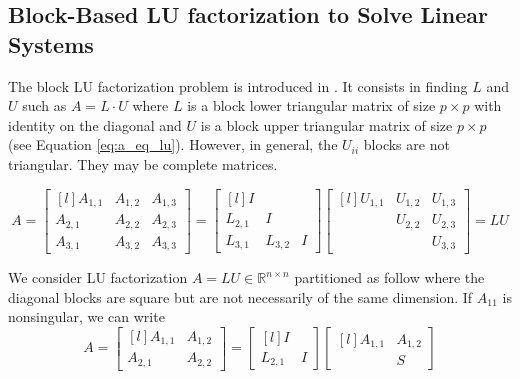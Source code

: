 

\subsection{Block-Based LU factorization to Solve Linear Systems}

The block LU factorization problem is introduced in \cite{DemHS1995} \cite{GoluL1983} \cite{BuncR1976}.
It consists in finding $L$ and $U$ such as $A=L\cdot U$ where $L$ is a block lower triangular matrix of size $p \times p$ with identity on the diagonal and $U$ is a block upper triangular matrix of size $p\times p$ (see Equation \ref{eq:a_eq_lu}).
However, in general, the $U_{ii}$ blocks are not triangular.
They may be complete matrices.

\begin{equation}
	\label{eq:a_eq_lu}
	A =
	\begin{bmatrix*}[l]
	A_{1,1} & A_{1,2} & A_{1,3}\\
	A_{2,1} & A_{2,2} & A_{2,3}\\
	A_{3,1} & A_{3,2} & A_{3,3}
	\end{bmatrix*}
	=
	\begin{bmatrix*}[l]
	I       &         &\\
	L_{2,1} & I       &\\
	L_{3,1} & L_{3,2} & I
	\end{bmatrix*}
	\begin{bmatrix*}[l]
	U_{1,1} & U_{1,2} & U_{1,3}\\
	        & U_{2,2} & U_{2,3}\\
	        &         & U_{3,3}
	\end{bmatrix*}
	=
	LU
\end{equation}


We consider LU factorization $A=LU \in \mathbb{R}^{n \times n}$ partitioned as follow where the diagonal blocks are square but are not necessarily of the same dimension.
If $A_{11}$ is nonsingular, we can write
\begin{equation}
	\label{eq:a_eq_lu_schur}
	A =
	\begin{bmatrix*}[l]
	A_{1,1} & A_{1,2}\\
	A_{2,1} & A_{2,2}
	\end{bmatrix*}
	=
	\begin{bmatrix*}[l]
	I       & \\
	L_{2,1} & I
	\end{bmatrix*}
	\begin{bmatrix*}[l]
	A_{1,1} & A_{1,2}\\
	        & S
	\end{bmatrix*}
\end{equation}

